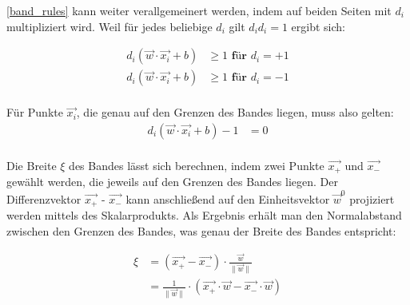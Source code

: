 \documentclass[a4paper,11pt,twoside]{scrreprt}
\begin{document}
\autoref{band_rules} kann weiter verallgemeinert werden, indem auf beiden Seiten mit $d_{i}$ multipliziert wird. Weil für jedes beliebige $d_{i}$ gilt $d_{i} d_{i} = 1$ ergibt sich:

\begin{equation} \label{band_rule}
    \begin{aligned}
    d_{i} (\vec{w} \cdot \vec{x_{i}} + b) & \geq 1 \textbf{ für $d_{i} = +1$}\\
    d_{i} (\vec{w} \cdot \vec{x_{i}} + b) & \geq 1 \textbf{ für $d_{i} = -1$}\\
    \end{aligned}
\end{equation}

Für Punkte $\vec{x_{i}}$, die genau auf den Grenzen des Bandes liegen, muss also gelten:
\begin{equation} \label{band_rule}
    \begin{aligned}
    d_{i} (\vec{w} \cdot \vec{x_{i}} + b) -1 &= 0\\
    \end{aligned}
\end{equation}

Die Breite $\xi$ des Bandes lässt sich berechnen, indem zwei Punkte $\vec{x_{+}}$ und $\vec{x_{-}}$ gewählt werden, die jeweils auf den Grenzen des Bandes liegen. Der Differenzvektor $\vec{x_{+}}$ - $\vec{x_{-}}$ kann anschließend auf den Einheitsvektor $\vec{w}^{0}$ projiziert werden mittels des Skalarprodukts. Als Ergebnis erhält man den Normalabstand zwischen den Grenzen des Bandes, was genau der Breite des Bandes entspricht:

\begin{equation} \label{band_width}
    \begin{aligned}
    \xi &= (\vec{x_{+}} - \vec{x_{-}}) \cdot \frac{\vec{w}}{\lVert \vec{w} \rVert}\\
    &=  \frac{1}{\lVert \vec{w} \rVert} \cdot (\vec{x_{+}} \cdot \vec{w} - \vec{x_{-}} \cdot \vec{w})
    \end{aligned}
\end{equation}
\end{document}
